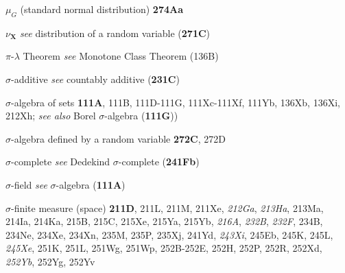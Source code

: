 $\mu_G$ (standard normal distribution) {\bf 274Aa}




\indexmedskip\indexheader{$\scriptstyle\pmb{\nu}$}

$\nu_{\pmb{X}}$ {\it see} distribution of a random variable
({\bf 271C})




\indexmedskip
\indexheader{$\scriptstyle\pmb{\pi}$}















$\pi$-$\lambda$ Theorem {\it see} Monotone Class Theorem (136B)

\indexmedskip





\indexmedskip
\indexheader{$\scriptstyle\pmb{\sigma}$}

$\sigma$-additive {\it see} countably additive ({\bf 231C})






$\sigma$-algebra of sets {\bf 111A}, 111B,
111D-111G, 
111Xc-111Xf, 
111Yb, 136Xb, 136Xi,
  212Xh; 
  {\it see also}
Borel $\sigma$-algebra ({\bf 111G}))


$\sigma$-algebra defined by a random variable {\bf 272C},
272D








$\sigma$-complete {\it see} Dedekind $\sigma$-complete
({\bf 241Fb})






$\sigma$-field {\it see} $\sigma$-algebra ({\bf 111A})







$\sigma$-finite measure (space) {\bf 211D}, 211L, 211M, 211Xe,
{\it 212Ga}, {\it 213Ha}, 213Ma, 214Ia, 214Ka, 215B, 215C, 215Xe,
215Ya, 215Yb, {\it 216A}, {\it 232B}, {\it 232F},
234B, 234Ne, 234Xe, 234Xn, 235M, 235P,
235Xj, 241Yd, {\it 243Xi}, 245Eb, 245K, 245L, {\it 245Xe}, 251K,
251L, 251Wg, 251Wp, 252B-252E, 
252H, 252P, 252R, 252Xd, {\it 252Yb}, 252Yg, 252Yv







